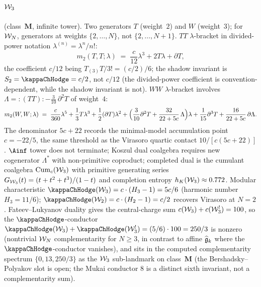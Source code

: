 \paragraph{$\mathcal{W}_3$} (class~$\mathbf{M}$, infinite tower).
Two generators $T$ (weight~$2$) and $W$ (weight~$3$); for
$\mathcal{W}_N$, generators at weights $\{2, \dots, N\}$, not
$\{2, \dots, N+1\}$. $TT$ $\lambda$-bracket in divided-power
notation $\lambda^{(n)} = \lambda^n/n!$:
\[
m_2(T,T;\lambda) \;=\; \frac{c}{12}\lambda^3 + 2T\lambda + \partial T,
\]
the coefficient $c/12$ being $T_{(3)}T/3! = (c/2)/6$; the shadow
invariant is $S_2 = \kappaChHodge = c/2$, not $c/12$ (the
divided-power coefficient is convention-dependent, while the
shadow invariant is not).
$WW$ $\lambda$-bracket involves
$\Lambda = {}\!:(TT): - \tfrac{3}{10}\,\partial^2 T$ of weight~$4$:
\[
m_2(W,W;\lambda)
\;=\;
\frac{c}{360}\lambda^5
+ \frac{1}{3}T\lambda^3
+ \frac{1}{2}(\partial T)\lambda^2
+ \Bigl(\frac{3}{10}\partial^2 T
 + \frac{32}{22+5c}\,\Lambda\Bigr)\lambda
+ \frac{1}{15}\partial^3 T
+ \frac{16}{22+5c}\,\partial\Lambda.
\]
The denominator $5c + 22$ records the minimal-model accumulation
point $c = -22/5$, the same threshold as the Virasoro quartic
contact $10/[c(5c + 22)]$.
$\Ainf$ tower does not terminate; Koszul dual coalgebra requires
new cogenerator $\Lambda^*$ with non-primitive coproduct;
completed dual is the cumulant coalgebra
$\operatorname{Cum}_c(\mathcal{W}_3)$ with primitive generating series
$G_{\mathcal{W}_3}(t) = (t + t^2 + t^3)/(1 - t)$ and completion entropy
$h_K(\mathcal{W}_3) \approx 0.772$.
Modular characteristic
$\kappaChHodge(\cW_3) = c\cdot(H_3 - 1) = 5c/6$
(harmonic number $H_3 = 11/6$); $\kappaChHodge(\cW_2) =
c\cdot(H_2 - 1) = c/2$ recovers Virasoro at $N = 2$.
Fateev--Lukyanov duality gives the central-charge sum
$c(\mathcal{W}_3) + c(\mathcal{W}_3^!) = 100$, so the
$\kappaChHodge$-conductor
$\kappaChHodge(\cW_3) + \kappaChHodge(\cW_3^!)
= (5/6)\cdot 100 = 250/3$
is nonzero (nontrivial $\mathcal{W}_N$ complementarity for $N \ge 3$,
in contrast to affine $\widehat{\mathfrak{g}}_k$ where the
$\kappaChHodge$-conductor vanishes), and sits in the computed
complementarity spectrum $\{0, 13, 250/3\}$ as the $\mathcal{W}_3$
sub-landmark on class~$\mathbf{M}$ (the Bershadsky--Polyakov slot
is open; the Mukai conductor $8$ is a distinct sixth invariant,
not a complementarity sum).

